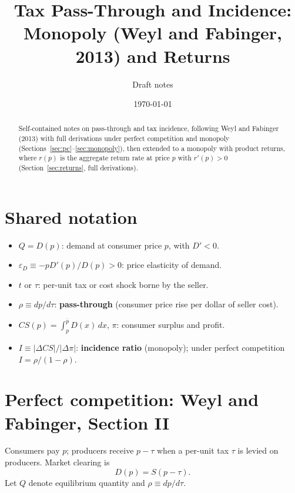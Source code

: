 \documentclass[11pt]{article}
\title{Tax Pass-Through and Incidence:\\
Monopoly (Weyl and Fabinger, 2013) and Returns}
\author{Draft notes}
\date{\today}
\begin{document}
\maketitle

\begin{abstract}
Self-contained notes on pass-through and tax incidence, following
Weyl and Fabinger (2013) with full derivations under perfect competition
and monopoly (Sections~\ref{sec:pc}--\ref{sec:monopoly}), then extended
to a monopoly with product returns, where $r(p)$ is the aggregate return
rate at price $p$ with $r'(p)>0$ (Section~\ref{sec:returns}, full derivations).
\end{abstract}

\section{Shared notation}
\label{sec:notation}

\begin{itemize}
  \item $Q = D(p)$: demand at consumer price $p$, with $D' < 0$.
  \item $\varepsilon_D \equiv -p D'(p)/D(p) > 0$: price elasticity of demand.
  \item $t$ or $\tau$: per-unit tax or cost shock borne by the seller.
  \item $\rho \equiv dp/d\tau$: \textbf{pass-through} (consumer price rise per
    dollar of seller cost).
  \item $CS(p) = \int_p^{\bar p} D(x)\,dx$, $\pi$: consumer surplus and profit.
  \item $I \equiv |\Delta CS|/|\Delta \pi|$: \textbf{incidence ratio} (monopoly);
    under perfect competition $I = \rho/(1-\rho)$.
\end{itemize}

\section{Perfect competition: Weyl and Fabinger, Section II}
\label{sec:pc}

Consumers pay $p$; producers receive $p - \tau$ when a per-unit tax $\tau$ is
levied on producers.  Market clearing is
\begin{equation}
  D(p) = S(p - \tau).
  \label{eq:pc-clearing}
\end{equation}
Let $Q$ denote equilibrium quantity and $\rho \equiv dp/d\tau$.
\end{document}
